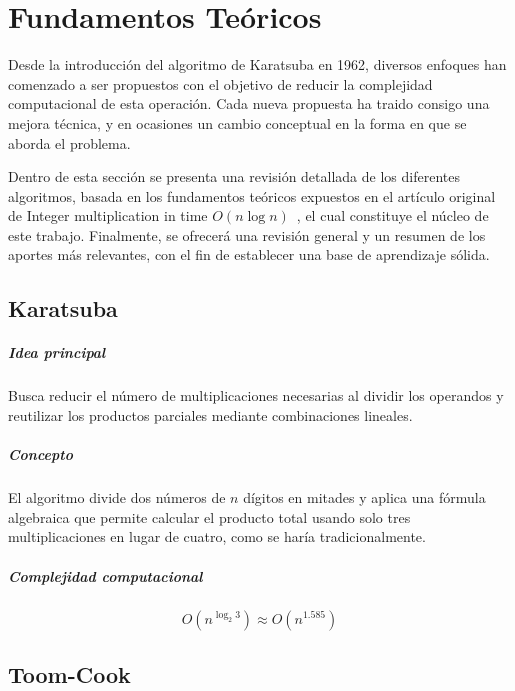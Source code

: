 \chapter{Fundamentos Teóricos}
\label{ch:lit_rev} %

Desde la introducción del algoritmo de Karatsuba en 1962, diversos enfoques han comenzado a ser propuestos con el objetivo de reducir la complejidad computacional de esta operación. Cada nueva propuesta ha traido consigo una mejora técnica, y en ocasiones un cambio conceptual en la forma en que se aborda el problema.

Dentro de esta sección se presenta una revisión detallada de los diferentes algoritmos, basada en los fundamentos teóricos expuestos en el artículo original de Integer multiplication in time \( O(n \log n) \)~\citep{HarveyHoeven2020}, el cual constituye el núcleo de este trabajo.
Finalmente, se ofrecerá una revisión general y un resumen de los aportes más relevantes, con el fin de establecer una base de aprendizaje sólida.

\section{Karatsuba} 

\paragraph{Idea principal} 
Busca reducir el número de multiplicaciones necesarias al dividir los operandos y reutilizar los productos parciales mediante combinaciones lineales.

\paragraph{Concepto} 
El algoritmo divide dos números de \( n \) dígitos en mitades y aplica una fórmula algebraica que permite calcular el producto total usando solo tres multiplicaciones en lugar de cuatro, como se haría tradicionalmente.

\paragraph{Complejidad computacional} 
\[
    O(n^{\log_2 3}) \approx O(n^{1.585})
\]

\section{Toom-Cook} 

